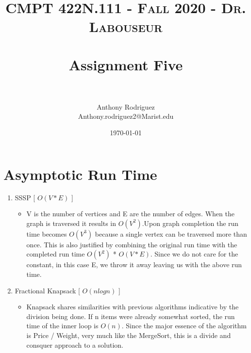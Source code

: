 \documentclass[letterpaper, 10pt,DIV=13]{scrartcl}
\title{	
   \normalfont \normalsize 
   \textsc{CMPT 422N.111 - Fall 2020 - Dr. Labouseur} \\[10pt] %
   \horrule{0.5pt} \\[0.25cm] 	%
   \huge Assignment Five  \\     	    %
   \horrule{0.5pt} \\[0.25cm] 	%
}
\author{Anthony Rodriguez \\ \normalsize Anthony.rodriguez2@Marist.edu}
\date{\normalsize\today} 	%
\numberwithin{equation}{section} %
\numberwithin{figure}{section} %
\numberwithin{table}{section} %
\begin{document}
\maketitle %

\section{Asymptotic Run Time}
\bigskip

\begin{enumerate}
   \item SSSP [ $O(V*E)$ ]
   \begin{itemize}
     \item V is the number of vertices and E are the number of edges. When the graph is traversed it results in $O(V^2)$.Upon graph completion the run time becomes $O(V^3)$ because a single vertex can be traversed more than once. This is also justified by combining the original run time with the completed run time $O(V^2)$ * $O(V*E)$. Since we do not care for the constant, in this case E, we throw it away leaving us with the above run time. 
   \end{itemize}
   \bigskip
   \item Fractional Knapsack [ $O(nlogn)$ ]
   \begin{itemize}
       \item Knapsack shares similarities with previous algorithms indicative by the division being done. If n items were already somewhat sorted, the run time of the inner loop is $O(n)$. Since the major essence of the algorithm is Price / Weight, very much like the MergeSort, this is a divide and consquer approach to a solution. 
   \end{itemize}
   \bigskip
    
  
    \bigskip
      
    
\end{enumerate}
\end{document}
